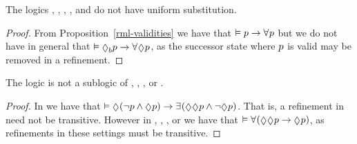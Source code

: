 \begin{proposition}
The logics \logicRmlK{}, \logicRmlKF{}, \logicRmlKFF{}, \logicRmlKD{}, \logicRmlSF{} and \logicRmlS{} do not have uniform substitution.
\end{proposition}

\begin{proof}
From Proposition~\ref{rml-validities} we have that $\entails \atomP \implies \allrefs \atomP$ but we do not have in general that $\entails \possibleB \atomP \implies \allrefs \possible \atomP$, as the successor state where $p$ is valid may be removed in a refinement.
\end{proof}

\begin{proposition}
The logic \logicRmlK{} is not a sublogic of \logicRmlKF{}, \logicRmlKFF{}, \logicRmlKD{}, \logicRmlSF{} or \logicRmlS{}.
\end{proposition}

\begin{proof}
In \logicRmlK{} we have that $\entails \possible (\lnot \atomP \land \possible \atomP) \implies \somerefs (\possible \possible \atomP \land \lnot \possible \atomP)$. 
That is, a refinement in \logicRmlK{} need not be transitive.
However in \logicRmlKF{}, \logicRmlKFF{}, \logicRmlKD{}, \logicRmlSF{} or \logicRmlS{} we have that $\entails \allrefs (\possible \possible \atomP \implies \possible \atomP)$, as refinements in these settings must be transitive.
\end{proof}
